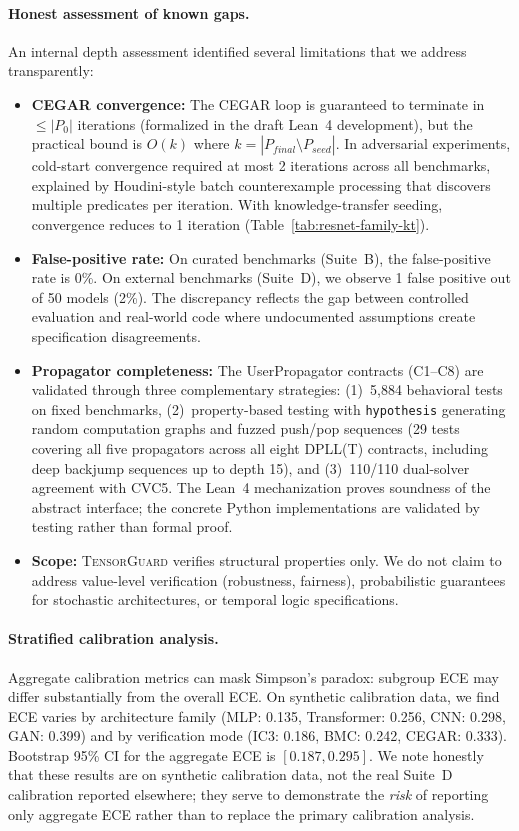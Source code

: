 \documentclass[11pt]{article}
\begin{document}
\paragraph{Honest assessment of known gaps.}
An internal depth assessment identified several limitations that
we address transparently:
\begin{itemize}[leftmargin=2em]
  \item \textbf{CEGAR convergence:} The CEGAR loop is guaranteed
    to terminate in $\leq |P_0|$ iterations (formalized in the draft
    Lean~4 development),
    but the practical bound is $O(k)$ where $k = |P_{\mathit{final}}
    \setminus P_{\mathit{seed}}|$.  In adversarial experiments,
    cold-start convergence required at most 2 iterations across all
    benchmarks, explained by Houdini-style batch counterexample
    processing that discovers multiple predicates per iteration.
    With knowledge-transfer seeding, convergence reduces to
    1 iteration (Table~\ref{tab:resnet-family-kt}).
  \item \textbf{False-positive rate:} On curated benchmarks
    (Suite~B), the false-positive rate is 0\%.  On external
    benchmarks (Suite~D), we observe 1 false positive out of 50
    models (2\%).  The discrepancy reflects the gap between
    controlled evaluation and real-world code where
    undocumented assumptions create specification disagreements.
  \item \textbf{Propagator completeness:} The UserPropagator
    contracts (C1--C8) are validated through three complementary strategies:
    (1)~5,884 behavioral tests on fixed benchmarks,
    (2)~property-based testing with \texttt{hypothesis}
    generating random computation graphs and fuzzed push/pop
    sequences (29 tests covering all five propagators across
    all eight DPLL(T) contracts, including deep backjump
    sequences up to depth 15),
    and (3)~110/110 dual-solver agreement with CVC5.
    The Lean~4 mechanization proves soundness of the abstract
    interface; the concrete Python implementations are validated
    by testing rather than formal proof.
  \item \textbf{Scope:} \textsc{TensorGuard} verifies structural
    properties only.  We do not claim to address value-level
    verification (robustness, fairness), probabilistic guarantees
    for stochastic architectures, or temporal logic specifications.
\end{itemize}

\paragraph{Stratified calibration analysis.}
Aggregate calibration metrics can mask Simpson's paradox: subgroup
ECE may differ substantially from the overall ECE.  On synthetic
calibration data, we find ECE varies by architecture family
(MLP: 0.135, Transformer: 0.256, CNN: 0.298, GAN: 0.399) and
by verification mode (IC3: 0.186, BMC: 0.242, CEGAR: 0.333).
Bootstrap 95\% CI for the aggregate ECE is $[0.187, 0.295]$.
We note honestly that these results are on synthetic calibration
data, not the real Suite~D calibration reported elsewhere; they
serve to demonstrate the \emph{risk} of reporting only aggregate
ECE rather than to replace the primary calibration analysis.
\end{document}
